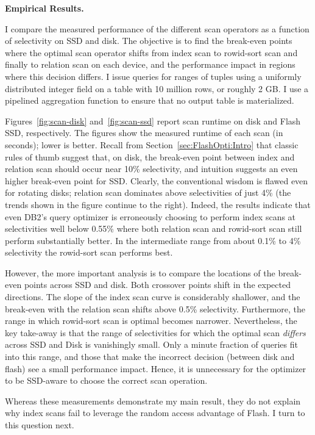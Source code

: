 \textbf{Empirical Results.}

I compare the measured performance of the different scan operators as a function of selectivity on SSD and disk.
The objective is to find the break-even points where the optimal scan operator shifts from index scan to rowid-sort scan and finally to relation scan on each device, and the performance impact in regions where this decision differs.
I issue queries for ranges of tuples using a uniformly distributed integer field on a table with 10 million rows, or roughly 2 GB. 
I use a pipelined aggregation function to ensure that no output table is materialized.

Figures~\ref{fig:scan-disk} and~\ref{fig:scan-ssd} report scan runtime on disk and Flash SSD, respectively.
The figures show the measured runtime of each scan (in seconds); lower is better. 
Recall from Section~\ref{sec:FlashOpti:Intro} that classic rules of thumb suggest that, on disk, the break-even point between index and relation scan should occur near 10\% selectivity, and intuition suggests an even higher break-even point for SSD.
Clearly, the conventional wisdom is flawed even for rotating disks; relation scan dominates above selectivities of just 4\% (the trends shown in the figure continue to the right).  
Indeed, the results indicate that even DB2's query optimizer is erroneously choosing to perform index scans at selectivities well below 0.55\% where both relation scan and rowid-sort scan still perform substantially better. 
In the intermediate range from about 0.1\% to 4\% selectivity the rowid-sort scan performs best.

However, the more important analysis is to compare the locations of the break-even points across SSD and disk.  
Both crossover points shift in the expected directions.
The slope of the index scan curve is considerably shallower, and the break-even with the relation scan shifts above 0.5\% selectivity.  
Furthermore, the range in which rowid-sort scan is optimal becomes narrower.
Nevertheless, the key take-away is that the range of selectivities for which the optimal scan \emph{differs} across SSD and Disk is vanishingly small.
Only a minute fraction of queries fit into this range, and those that make the incorrect decision (between disk and flash) see a small performance impact.
Hence, it is unnecessary for the optimizer to be SSD-aware to choose the correct scan operation.

Whereas these measurements demonstrate my main result, they do not explain why index scans fail to leverage the random access advantage of Flash.  
I turn to this question next. 

